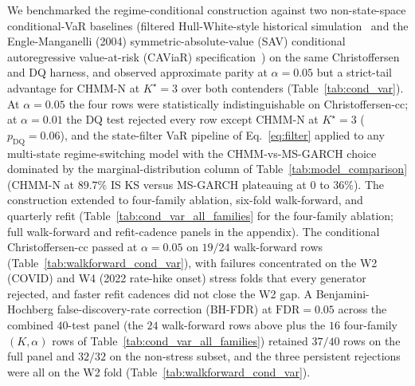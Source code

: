 We benchmarked the regime-conditional construction against two non-state-space conditional-VaR baselines (filtered Hull-White-style historical simulation~\cite{barone1999var} and the Engle-Manganelli (2004) symmetric-absolute-value (SAV) conditional autoregressive value-at-risk (CAViaR) specification~\cite{engle2004caviar}) on the same Christoffersen and DQ harness, and observed approximate parity at $\alpha = 0.05$ but a strict-tail advantage for CHMM-N at $K^\star = 3$ over both contenders (Table~\ref{tab:cond_var}). At $\alpha = 0.05$ the four rows were statistically indistinguishable on Christoffersen-cc; at $\alpha = 0.01$ the DQ test rejected every row except CHMM-N at $K^\star = 3$ ($p_{\text{DQ}} = 0.06$), and the state-filter VaR pipeline of Eq.~\eqref{eq:filter} applied to any multi-state regime-switching model with the CHMM-vs-MS-GARCH choice dominated by the marginal-distribution column of Table~\ref{tab:model_comparison} (CHMM-N at $89.7\%$ IS KS versus MS-GARCH plateauing at $0$ to $36\%$). The construction extended to four-family ablation, six-fold walk-forward, and quarterly refit (Table~\ref{tab:cond_var_all_families} for the four-family ablation; full walk-forward and refit-cadence panels in the appendix). The conditional Christoffersen-cc passed at $\alpha = 0.05$ on $19/24$ walk-forward rows (Table~\ref{tab:walkforward_cond_var}), with failures concentrated on the W2 (COVID) and W4 (2022 rate-hike onset) stress folds that every generator rejected, and faster refit cadences did not close the W2 gap. A Benjamini-Hochberg false-discovery-rate correction (BH-FDR) at $\text{FDR} = 0.05$ across the combined $40$-test panel (the $24$ walk-forward rows above plus the $16$ four-family $(K, \alpha)$ rows of Table~\ref{tab:cond_var_all_families}) retained $37/40$ rows on the full panel and $32/32$ on the non-stress subset, and the three persistent rejections were all on the W2 fold (Table~\ref{tab:walkforward_cond_var}).
